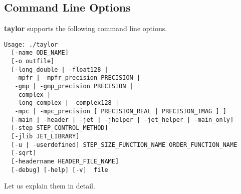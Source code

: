 \documentclass[10pt]{article}
\theoremstyle{remark}
\newcommand{\taylorname}{{\bf taylor}}
\begin{document}
\subsection{Command Line Options}\label{sec:clo}

\taylorname{} supports the following command line options.
\begin{verbatim}
Usage: ./taylor 
  [-name ODE_NAME]
  [-o outfile] 
  [-long_double | -float128 | 
   -mpfr | -mpfr_precision PRECISION |
   -gmp | -gmp_precision PRECISION |
   -complex | 
   -long_complex | -complex128 | 
   -mpc | -mpc_precision [ PRECISION_REAL | PRECISION_IMAG ] ]
  [-main | -header | -jet | -jhelper | -jet_helper | -main_only] 
  [-step STEP_CONTROL_METHOD]
  [-jlib JET_LIBRARY]
  [-u | -userdefined] STEP_SIZE_FUNCTION_NAME ORDER_FUNCTION_NAME 
  [-sqrt]
  [-headername HEADER_FILE_NAME]
  [-debug] [-help] [-v]  file
\end{verbatim}

Let us explain them in detail.
\end{document}

